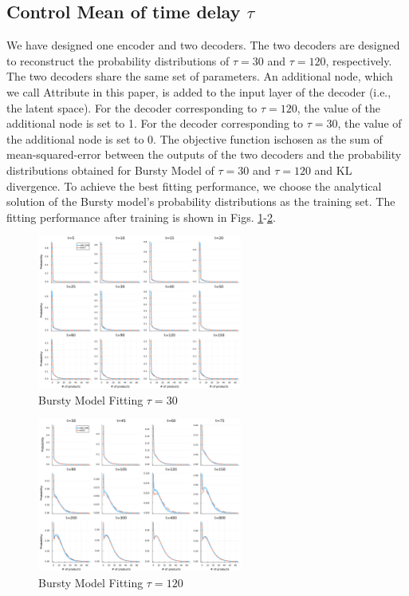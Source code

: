 \documentclass[a4paper,10pt]{article}
\begin{document}
\subsection{Control Mean of time delay $\tau$}
We have designed one encoder and two decoders. The two decoders are designed to reconstruct the probability distributions of $\tau=30$ and $\tau=120$, respectively. The two decoders share the same set of parameters. An additional node, which we call Attribute in this paper, is added to the input layer of the decoder (i.e., the latent space). For the decoder corresponding to $\tau=120$, the value of the additional node is set to 1. For the decoder corresponding to $\tau=30$, the value of the additional node is set to 0. The  objective  function  ischosen as the sum of mean-squared-error between the outputs of the two decoders and the probability distributions obtained for Bursty Model of $\tau=30$ and $\tau=120$ and KL divergence. To achieve the best fitting performance, we choose the analytical solution of the Bursty model’s probability distributions as the training set. The fitting performance after training is shown in Figs. \ref{Bursty_fitting_tau=30}-\ref{Bursty_fitting_tau=120}.
\begin{figure}[h]
	\centering
	\includegraphics[width=0.6\textwidth]{Figs/Bursty_fitting_tau=30.pdf}
	\caption{Bursty Model Fitting $\tau=30$}\label{Bursty_fitting_tau=30}  
\end{figure}
\begin{figure}[h]
	\centering
	\includegraphics[width=0.6\textwidth]{Figs/Bursty_fitting_tau=120.pdf}
	\caption{Bursty Model Fitting $\tau=120$}\label{Bursty_fitting_tau=120}  
\end{figure}
\end{document}
